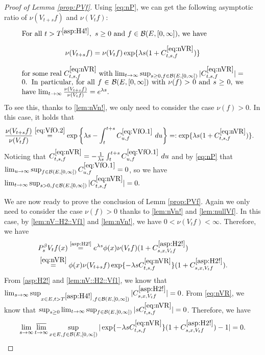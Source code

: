 \documentclass[12pt,a4paper]{amsart}
\numberwithin{equation}{section}
\theoremstyle{plain}
\theoremstyle{definition}
\theoremstyle{remark}
\begin{document}
\begin{proof}[Proof of Lemma \ref{prop:PVf}]
	Using \eqref{eq:nP}, we can get the following asymptotic ratio of $\nu(V_{t+s}f)$ and $\nu(V_tf)$:
\begin{equation} \label{eq:nVR}
\begin{minipage}{0.9\textwidth}
	For all $t> T^{\eqref{asp:H4!}},~s \geq 0$ and $f\in \mathcal B(E,[0,\infty])$, we have \[\nu(V_{t+s}f) = \nu(V_tf) \exp\{\lambda s (1+C^{\eqref{eq:nVR}}_{t,s,f}) \}\] for some real $C^{\eqref{eq:nVR}}_{t,s,f}$ with
	 $\lim_{t\to \infty} \sup_{s\geq  0,f\in \mathcal B(E,[0,\infty])} |C^{\eqref{eq:nVR}}_{t,s,f}| = 0$.
	In particular, for all $f\in \mathcal B(E,[0,\infty])$ with $\nu(f)>0$ and $s\geq 0$, we have $\lim_{t\to \infty} \frac{\nu(V_{t+s}f)}{\nu(V_tf)} = e^{\lambda s}$.
\end{minipage}
\end{equation}
	To see this, thanks to \eqref{lem:nVn!},
	we only need to consider the case $\nu(f)>0$. In this case,  it holds  that
\begin{align}
	&\frac{\nu(V_{t+s} f)} {\nu(V_t f)}
	\overset{\eqref{eq:VfO.2}}= \exp\left\{\lambda s- \int_t^{t+s} C^{\eqref{eq:VfO.1}}_{u,f} ~du\right\}
	=: \exp\{\lambda s (1+C^{\eqref{eq:nVR}}_{t,s,f}) \}.
\end{align}
	Noticing that $C^{\eqref{eq:nVR}}_{t,s,f} = -\frac{1}{\lambda s}\int_t^{t+s} C^{\eqref{eq:VfO.1}}_{u,f} ~du$ and by \eqref{eq:nP} that $\lim_{u\to \infty}\sup_{f\in \mathcal B(E,[0,\infty])} C^{\eqref{eq:VfO.1}}_{u,f} = 0$,
	so we have
	$\lim_{t\to \infty} \sup_{s> 0,f\in \mathcal B(E,[0,\infty])} |C^{\eqref{eq:nVR}}_{t,s,f}| = 0. $
	
	We are now  ready to prove the conclusion of Lemm \ref{prop:PVf}.
	Again we only need to consider the case $\nu(f)>0$ thanks to \eqref{lem:nVn!} and  \eqref{lem:nullVf}.
	In this case, by \eqref{lem:nV::H2::Vf1} and \eqref{lem:nVn!}, we have $0<\nu(V_{t}f)<\infty$.
	Therefore, we have
\begin{align}
	& P_s^\beta V_t f(x)
	\overset{\text{\eqref{asp:H2!}}}= e^{\lambda s} \phi(x) \nu(V_tf) (1+C^{\eqref{asp:H2!}}_{s,x,V_tf})
	\\&\overset{\eqref{eq:nVR}}= \phi(x) \nu(V_{t+s}f) \exp\{-\lambda s C^{\eqref{eq:nVR}}_{t,s,f}\} (1+C^{\eqref{asp:H2!}}_{s,x,V_tf}).
\end{align}
	From \eqref{asp:H2!} and \eqref{lem:nV::H2::Vf1}, we know that $\lim_{s\to \infty} \sup_{x\in E, t> T^{\eqref{asp:H4!}}, f\in \mathcal B(E,[0,\infty])}
	|C^{\eqref{asp:H2!}}_{s,x,V_tf}| = 0$.
	From \eqref{eq:nVR}, we know that $\sup_{s\geq 0} \lim_{t\to \infty} \sup_{f\in \mathcal B(E,[0,\infty])}
	|sC^{\eqref{eq:nVR}}_{t,s,f}| = 0$.
	Therefore, we have
	\[
	\lim_{s\to \infty}\varlimsup_{t\to \infty}\sup_{x\in E, f\in \mathcal B(E,[0,\infty])}
	|\exp\{-\lambda s C^{\eqref{eq:nVR}}_{t,s,f}\} (1+C^{\eqref{asp:H2!}}_{s,x,V_tf})-1| = 0. \qedhere\]
\end{proof}
\end{document}
